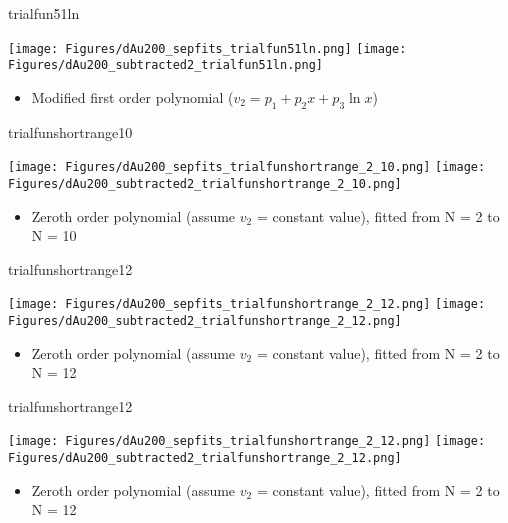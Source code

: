 \documentclass[aspectratio=169,compress,10pt]{beamer}
\begin{document}
\begin{frame}{trialfun51ln}
\begin{center}
\texttt{[image: Figures/dAu200\_sepfits\_trialfun51ln.png]}
\texttt{[image: Figures/dAu200\_subtracted2\_trialfun51ln.png]}
\end{center}
\begin{itemize}
\item Modified first order polynomial ($v_2 = p_1 + p_2x + p_3\ln x$)
\end{itemize}
\end{frame}



\begin{frame}{trialfunshortrange10}
\begin{center}
\texttt{[image: Figures/dAu200\_sepfits\_trialfunshortrange\_2\_10.png]}
\texttt{[image: Figures/dAu200\_subtracted2\_trialfunshortrange\_2\_10.png]}
\end{center}
\begin{itemize}
\item Zeroth order polynomial (assume $v_2$ = constant value), fitted from N = 2 to N = 10
\end{itemize}
\end{frame}



\begin{frame}{trialfunshortrange12}
\begin{center}
\texttt{[image: Figures/dAu200\_sepfits\_trialfunshortrange\_2\_12.png]}
\texttt{[image: Figures/dAu200\_subtracted2\_trialfunshortrange\_2\_12.png]}
\end{center}
\begin{itemize}
\item Zeroth order polynomial (assume $v_2$ = constant value), fitted from N = 2 to N = 12
\end{itemize}
\end{frame}



\begin{frame}{trialfunshortrange12}
\begin{center}
\texttt{[image: Figures/dAu200\_sepfits\_trialfunshortrange\_2\_12.png]}
\texttt{[image: Figures/dAu200\_subtracted2\_trialfunshortrange\_2\_12.png]}
\end{center}
\begin{itemize}
\item Zeroth order polynomial (assume $v_2$ = constant value), fitted from N = 2 to N = 12
\end{itemize}
\end{frame}
\end{document}
